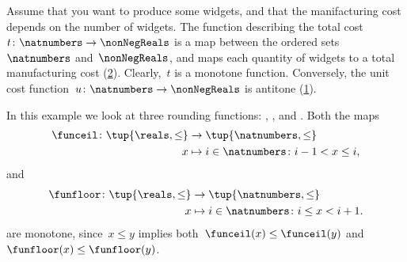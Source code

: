 \begin{comment}
    A monotone map is an \emph{order isomorphism} if the other direction
    of the implication holds as well:
    \begin{equation}
        a \leq_A b \quad \Leftrightarrow \quad f(a) \leq_B f(b).
    \end{equation}
\end{comment}

\begin{example}
    Assume that you want to produce some widgets, and that the manifacturing cost depends on the number of widgets.
    The function describing the total cost~$t\colon \natnumbers\to \nonNegReals$ is a map between the ordered sets~$\natnumbers$ and~$\nonNegReals$, and maps each quantity of widgets to a total manufacturing cost (\cref{fig:total_manufacturing}).
    Clearly,~$t$ is a monotone function.
    Conversely, the unit cost function~$u\colon \natnumbers\to \nonNegReals$ is antitone (\cref{fig:unit_manufacturing}).
\end{example}

\begin{figure}[h!]
    \caption{}
    \label{fig:unit_manufacturing}
\end{figure}

\begin{figure}[h!]
    \caption{}
    \label{fig:total_manufacturing}
\end{figure}



\begin{example}
    \label{ex:rounding-functions}
    In this example we look at three rounding functions: \funceil, \funfloor, and \rtntte. Both the maps
    \begin{equation*}
        \begin{aligned}
            \funceil\colon \tup{\reals,\leq}&\to \tup{\natnumbers,\leq}\\
            x&\mapsto i \in \natnumbers \colon i-1<x\leq i,
        \end{aligned}
    \end{equation*}
    and
    \begin{equation*}
        \begin{aligned}
            \funfloor\colon \tup{\reals,\leq}&\to \tup{\natnumbers,\leq}\\
            x&\mapsto i \in \natnumbers \colon i\leq x< i+1.
        \end{aligned}
    \end{equation*}
    are monotone, since~$x\leq y$ implies both~$\funceil(x)\leq \funceil(y)$ and~$\funfloor(x)\leq\funfloor(y)$.
\end{example}

